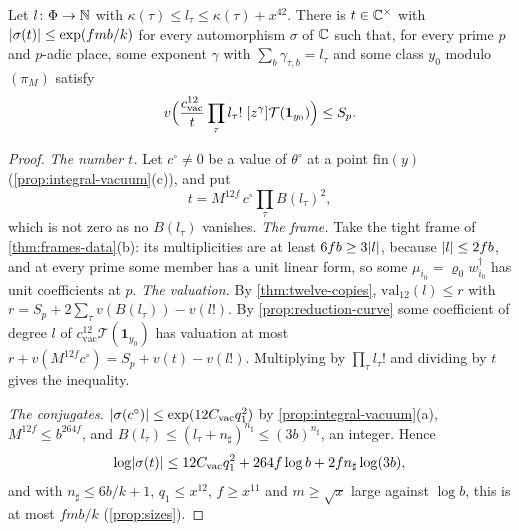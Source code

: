 \begin{theorem}\label{thm:sharpness}
Let $l\colon\Phi\to\mathbb{N}$ with $\kappa(\tau)\le l_\tau\le\kappa(\tau)+x^{42}$. There is $t\in\mathbb{C}^\times$ with
$\lvert \sigma(t)\rvert\le\exp(fmb/k)$ for every automorphism $\sigma$ of $\mathbb{C}$ such that, for every prime $p$ and
$p$-adic place, some exponent $\gamma$ with $\sum_b\gamma_{\tau,b}=l_\tau$ and some class $y_0$ modulo
$(\pi_M)$ satisfy
\[
  v\Bigl(\frac{c_{\mathrm{vac}}^{12}}t\prod_\tau l_\tau!\;[z^\gamma]\mathcal T(\mathbf 1_{y_0})\Bigr)\le S_p .
\]
\end{theorem}

\begin{proof}
\emph{The number $t$.} Let $c^\circ\ne0$ be a value of $\theta^\circ$ at a point $\mathrm{fin}(y)$ (\cref{prop:integral-vacuum}(c)), and put
\[
  t=M^{12f}\,c^\circ\prod_\tau B(l_\tau)^2 ,
\]
which is not zero as no $B(l_\tau)$ vanishes. \emph{The frame.} Take the tight frame of \cref{thm:frames-data}(b): its multiplicities are at least $6fb\ge3\lvert l\rvert$, because $\lvert l\rvert\le2fb$, and at every prime some member has a unit linear form, so some $\mu_{i_0}=\varrho_0w_{i_0}^\dagger$ has unit coefficients at $p$. \emph{The valuation.} By \cref{thm:twelve-copies}, $\mathrm{val}_{12}(l)\le r$ with $r=S_p+2\sum_\tau v(B(l_\tau))-v(l!)$. By \cref{prop:reduction-curve} some coefficient of degree $l$ of $c_{\mathrm{vac}}^{12}\mathcal T(\mathbf1_{y_0})$ has valuation at most $r+v(M^{12f}c^\circ)=S_p+v(t)-v(l!)$. Multiplying by $\prod_\tau l_\tau!$ and dividing by $t$ gives the inequality.

\emph{The conjugates.} $\lvert \sigma(c^\circ)\rvert\le\exp(12C_{\mathrm{vac}}q_1^2)$ by \cref{prop:integral-vacuum}(a), $M^{12f}\le b^{264f}$, and $B(l_\tau)\le(l_\tau+n_\sharp)^{n_\sharp}\le(3b)^{n_\sharp}$, an integer. Hence
\[
  \log\lvert \sigma(t)\rvert\le12C_{\mathrm{vac}}q_1^2+264f\log b+2fn_\sharp\log(3b),
\]
and with $n_\sharp\le6b/k+1$, $q_1\le x^{12}$, $f\ge x^{11}$ and $m\ge\sqrt x$ large against $\log b$, this is at most $fmb/k$ (\cref{prop:sizes}).
\end{proof}
